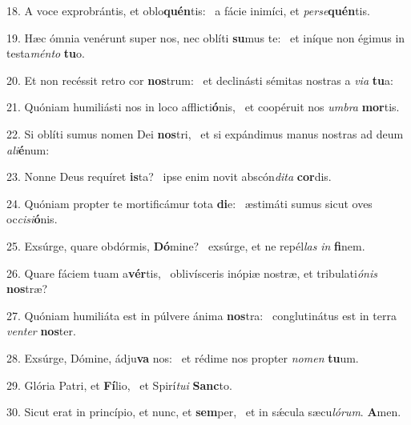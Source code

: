 18. A voce exprobrántis, et oblo\textbf{quén}tis: \ast\  a fácie inimíci, et \textit{per}\textit{se}\textbf{quén}tis.\

19. Hæc ómnia venérunt super nos, nec oblíti \textbf{su}mus te: \ast\  et iníque non égimus in testa\textit{mén}\textit{to} \textbf{tu}o.\

20. Et non recéssit retro cor \textbf{nos}trum: \ast\  et declinásti sémitas nostras a \textit{vi}\textit{a} \textbf{tu}a:\

21. Quóniam humiliásti nos in loco afflicti\textbf{ó}nis, \ast\  et coopéruit nos \textit{um}\textit{bra} \textbf{mor}tis.\

22. Si oblíti sumus nomen Dei \textbf{nos}tri, \ast\  et si expándimus manus nostras ad deum \textit{a}\textit{li}\textbf{é}num:\

23. Nonne Deus requíret \textbf{is}ta? \ast\  ipse enim novit abscón\textit{di}\textit{ta} \textbf{cor}dis.\

24. Quóniam propter te mortificámur tota \textbf{di}e: \ast\  æstimáti sumus sicut oves oc\textit{ci}\textit{si}\textbf{ó}nis.\

25. Exsúrge, quare obdórmis, \textbf{Dó}mine? \ast\  exsúrge, et ne repél\textit{las} \textit{in} \textbf{fi}nem.\

26. Quare fáciem tuam a\textbf{vér}tis, \ast\  oblivísceris inópiæ nostræ, et tribulati\textit{ó}\textit{nis} \textbf{nos}træ?\

27. Quóniam humiliáta est in púlvere ánima \textbf{nos}tra: \ast\  conglutinátus est in terra \textit{ven}\textit{ter} \textbf{nos}ter.\

28. Exsúrge, Dómine, ádju\textbf{va} nos: \ast\  et rédime nos propter \textit{no}\textit{men} \textbf{tu}um.\

29. Glória Patri, et \textbf{Fí}lio, \ast\  et Spirí\textit{tu}\textit{i} \textbf{Sanc}to.\

30. Sicut erat in princípio, et nunc, et \textbf{sem}per, \ast\  et in sǽcula sæcu\textit{ló}\textit{rum}. \textbf{A}men.\

